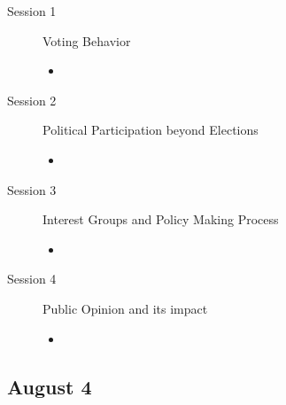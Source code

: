 \documentclass[12p,a4]{article}
\begin{document}
\begin{description}
\item[Session 1] {Voting Behavior}

    \begin{itemize}
         \item \citet[Chapter 5]{grotz2023political} 
    \end{itemize}
				
				
\item[Session 2] {Political Participation beyond Elections}
				
\begin{itemize}
\item \citet{müller-rommel1985}
\end{itemize}
				
\item[Session 3] {Interest Groups and Policy Making Process}				
				
		\begin{itemize}
            \item \citet[Chapter 7]{grotz2023political} 
		\end{itemize}
				
\item[Session 4] {Public Opinion and its impact}				
				
\begin{itemize}
    \item \citet{Metag2016}
\end{itemize}

\end{description}				


\subsection*{August 4}
\end{document}
